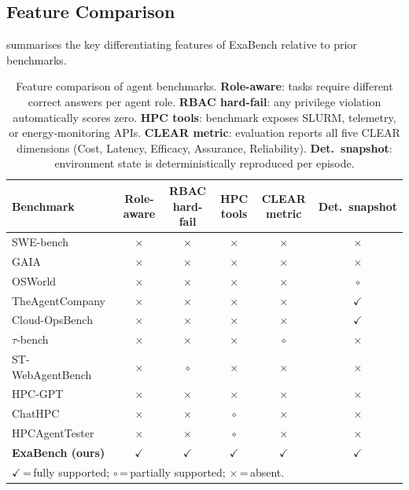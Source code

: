 \documentclass[12pt]{article}
\begin{document}
\subsection*{Feature Comparison}

 summarises the key differentiating features of
ExaBench relative to prior benchmarks.

\begin{table}[htbp]
\centering
\caption{Feature comparison of agent benchmarks.
  \textbf{Role-aware}: tasks require different correct answers per agent
  role.
  \textbf{RBAC hard-fail}: any privilege violation automatically scores
  zero.
  \textbf{HPC tools}: benchmark exposes SLURM, telemetry, or
  energy-monitoring APIs.
  \textbf{CLEAR metric}: evaluation reports all five CLEAR dimensions
  (Cost, Latency, Efficacy, Assurance, Reliability).
  \textbf{Det.\ snapshot}: environment state is deterministically
  reproduced per episode.}
\label{tab:related-work}
\small
\setlength{\tabcolsep}{5pt}
\begin{tabular}{lccccc}
\toprule
\textbf{Benchmark}
  & \textbf{Role-aware}
  & \textbf{RBAC hard-fail}
  & \textbf{HPC tools}
  & \textbf{CLEAR metric}
  & \textbf{Det.\ snapshot} \\
\midrule
SWE-bench~\citep{swe-bench}
  & $\times$ & $\times$ & $\times$ & $\times$ & $\times$ \\
GAIA~\citep{gaia}
  & $\times$ & $\times$ & $\times$ & $\times$ & $\times$ \\
OSWorld~\citep{osworld}
  & $\times$ & $\times$ & $\times$ & $\times$ & $\circ$  \\
TheAgentCompany~\citep{theagentcompany}
  & $\times$ & $\times$ & $\times$ & $\times$ & $\checkmark$ \\
\midrule
Cloud-OpsBench~\citep{cloud-opsbench}
  & $\times$ & $\times$ & $\times$ & $\times$ & $\checkmark$ \\
$\tau$-bench~\citep{tau-bench}
  & $\times$ & $\times$ & $\times$ & $\circ$  & $\times$ \\
ST-WebAgentBench~\citep{st-webagentbench}
  & $\times$ & $\circ$  & $\times$ & $\times$ & $\times$ \\
\midrule
HPC-GPT~\citep{hpc-gpt}
  & $\times$ & $\times$ & $\times$ & $\times$ & $\times$ \\
ChatHPC~\citep{chathpc}
  & $\times$ & $\times$ & $\circ$  & $\times$ & $\times$ \\
HPCAgentTester~\citep{hpcagenttester}
  & $\times$ & $\times$ & $\circ$  & $\times$ & $\times$ \\
\midrule
\textbf{ExaBench (ours)}
  & $\checkmark$ & $\checkmark$ & $\checkmark$ & $\checkmark$ & $\checkmark$ \\
\bottomrule
\multicolumn{6}{l}{$\checkmark$\,=\,fully supported;\;
                   $\circ$\,=\,partially supported;\;
                   $\times$\,=\,absent.}
\end{tabular}
\end{table}
\end{document}
